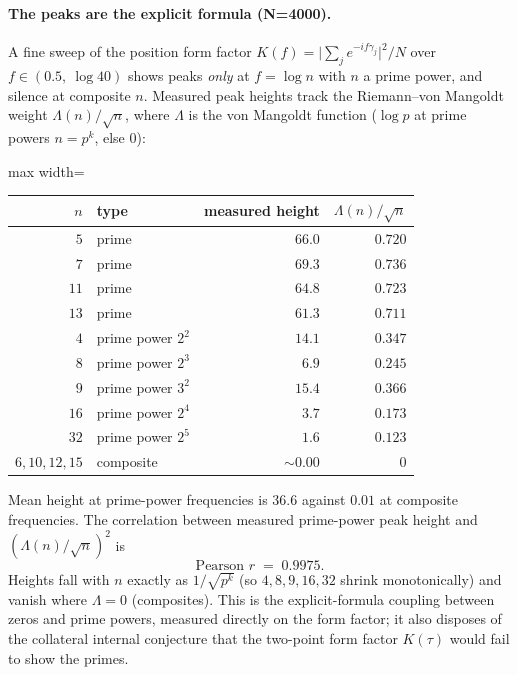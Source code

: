 \documentclass[11pt]{article}
\begin{document}
\paragraph{The peaks are the explicit formula (N=4000).}
A fine sweep of the position form factor $K(f)=\lvert\sum_j e^{-if\gamma_j}\rvert^2/N$ over $f\in(0.5,\ \log 40)$ shows peaks \emph{only} at $f=\log n$ with $n$ a prime power, and silence at composite $n$. Measured peak heights track the Riemann--von Mangoldt weight $\Lambda(n)/\sqrt n$, where $\Lambda$ is the von Mangoldt function ($\log p$ at prime powers $n=p^k$, else $0$):
\begin{center}
\begin{adjustbox}{max width=\linewidth}\begin{tabular}{rlrr}
\toprule
$n$ & type & measured height & $\Lambda(n)/\sqrt n$ \\
\midrule
$5$  & prime      & $66.0$ & $0.720$ \\
$7$  & prime      & $69.3$ & $0.736$ \\
$11$ & prime      & $64.8$ & $0.723$ \\
$13$ & prime      & $61.3$ & $0.711$ \\
$4$  & prime power $2^2$ & $14.1$ & $0.347$ \\
$8$  & prime power $2^3$ & $6.9$  & $0.245$ \\
$9$  & prime power $3^2$ & $15.4$ & $0.366$ \\
$16$ & prime power $2^4$ & $3.7$  & $0.173$ \\
$32$ & prime power $2^5$ & $1.6$  & $0.123$ \\
$6,10,12,15$ & composite & $\sim\!0.00$ & $0$ \\
\bottomrule
\end{tabular}\end{adjustbox}
\end{center}
Mean height at prime-power frequencies is $36.6$ against $0.01$ at composite frequencies. The correlation between measured prime-power peak height and $(\Lambda(n)/\sqrt n)^2$ is
\[
\text{Pearson } r \;=\; 0.9975 .
\]
Heights fall with $n$ exactly as $1/\sqrt{p^k}$ (so $4,8,9,16,32$ shrink monotonically) and vanish where $\Lambda=0$ (composites). This is the explicit-formula coupling between zeros and prime powers, measured directly on the form factor; it also disposes of the collateral internal conjecture that the two-point form factor $K(\tau)$ would fail to show the primes.
\end{document}
